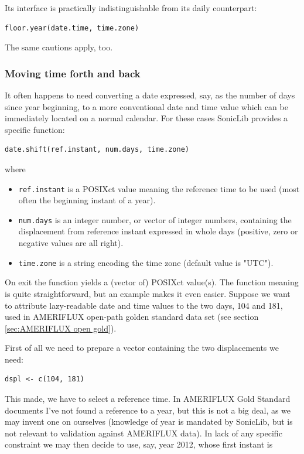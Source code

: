 \documentclass[a4paper,10pt]{book}
\begin{document}
Its interface is practically indistinguishable from its daily counterpart:

\begin{verbatim}
floor.year(date.time, time.zone)
\end{verbatim}

\noindent The same cautions apply, too.


\subsubsection{Moving time forth and back}

It often happens to need converting a date expressed, say, as the number of days since year beginning, to a more conventional date and time value which can be immediately located on a normal calendar. For these cases SonicLib provides a specific function:

\begin{verbatim}
date.shift(ref.instant, num.days, time.zone)
\end{verbatim}

\noindent where

\begin{itemize}
\item \verb|ref.instant| is a POSIXct value meaning the reference time to be used (most often the beginning instant of a year).
\item \verb|num.days| is an integer number, or vector of integer numbers, containing the displacement from reference instant expressed in whole days (positive, zero or negative values are all right).
\item \verb|time.zone| is a string encoding the time zone (default value is "UTC").
\end{itemize}

On exit the function yields a (vector of) POSIXct value(s). The function meaning is quite straightforward, but an example makes it even easier. Suppose we want to attribute lazy-readable date and time values to the two days, 104 and 181, used in AMERIFLUX open-path golden standard data set (see section \ref{sec:AMERIFLUX open gold}).

First of all we need to prepare a vector containing the two displacements we need:

\begin{verbatim}
dspl <- c(104, 181)
\end{verbatim}

This made, we have to select a reference time. In AMERIFLUX Gold Standard documents I've not found a reference to a year, but this is not a big deal, as we may invent one on ourselves (knowledge of year is mandated by SonicLib, but is not relevant to validation against AMERIFLUX data). In lack of any specific constraint we may then decide to use, say, year 2012, whose first instant is
\end{document}
